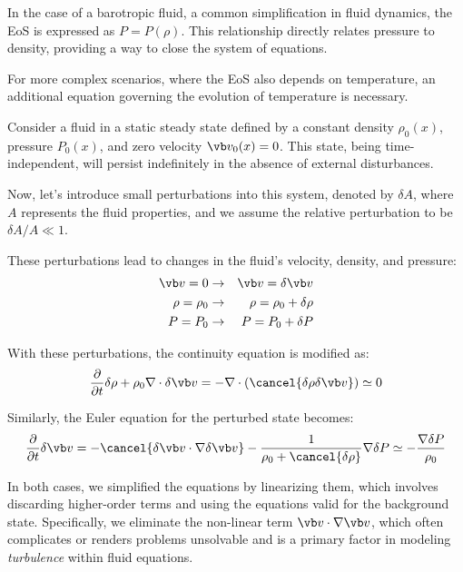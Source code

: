 In the case of a barotropic fluid, a common simplification in fluid dynamics, the EoS is expressed as \( P=P(\rho) \). This relationship directly relates pressure to density, providing a way to close the system of equations.

For more complex scenarios, where the EoS also depends on temperature, an additional equation governing the evolution of temperature is necessary. 


Consider a fluid in a static steady state defined by a constant density \( \rho_0(x) \), pressure \( P_0(x) \), and zero velocity \( \vb v_0(x) = 0 \). This state, being time-independent, will persist indefinitely in the absence of external disturbances.

Now, let's introduce small perturbations into this system, denoted by \( \delta A \), where \( A \) represents the fluid properties, and we assume the relative perturbation to be \( \delta A / A \ll 1 \). 

These perturbations lead to changes in the fluid's velocity, density, and pressure:
%
\begin{eqnarray}
\vb v = 0 & \rightarrow & \vb v = \delta \vb v \\
\rho = \rho_0 & \rightarrow & \rho = \rho_0 + \delta \rho \\
P = P_0 & \rightarrow & P = P_0 + \delta P
\end{eqnarray}

With these perturbations, the continuity equation is modified as:
%
\begin{equation}
\frac{\partial}{\partial t} \delta \rho + \rho_0 \nabla \cdot \delta \vb v = - \nabla \cdot ( \cancel{\delta \rho \delta \vb v}) \simeq 0
\end{equation}

Similarly, the Euler equation for the perturbed state becomes:
%
\begin{equation}
\frac{\partial}{\partial t} \delta \vb v = -\cancel{\delta \vb v \cdot \nabla \delta \vb v} - \frac{1}{\rho_0 + \cancel{\delta \rho}} \nabla \delta P \simeq - \frac{\nabla \delta P}{\rho_0} 
\end{equation}

In both cases, we simplified the equations by linearizing them, which involves discarding higher-order terms and using the equations valid for the background state. Specifically, we eliminate the non-linear term \( \vb v \cdot \nabla \vb v \), which often complicates or renders problems unsolvable and is a primary factor in modeling \emph{turbulence} within fluid equations.

